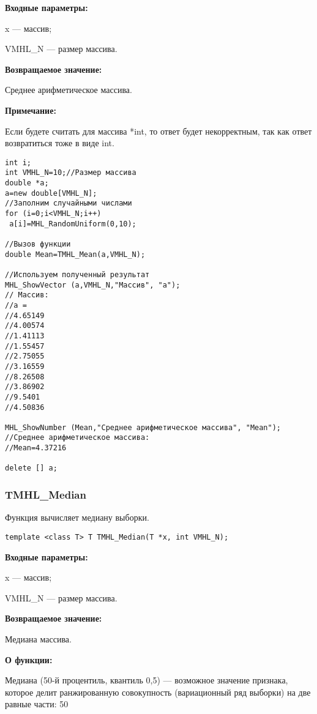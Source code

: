 \documentclass[a4paper,12pt]{article}
\begin{document}
\textbf{Входные параметры:}

 x --- массив;
 
 VMHL\_N --- размер массива.

\textbf{Возвращаемое значение:}

 Среднее арифметическое массива.
 
\textbf{Примечание:}

Если будете считать для массива *int, то ответ будет некорректным, так как ответ возвратиться тоже в виде int.
 



\begin{lstlisting}[label=code_use_TMHL_Mean,caption=Пример использования]
int i;
int VMHL_N=10;//Размер массива
double *a;
a=new double[VMHL_N];
//Заполним случайными числами
for (i=0;i<VMHL_N;i++)
 a[i]=MHL_RandomUniform(0,10);

//Вызов функции
double Mean=TMHL_Mean(a,VMHL_N);

//Используем полученный результат
MHL_ShowVector (a,VMHL_N,"Массив", "a");
// Массив:
//a =
//4.65149
//4.00574
//1.41113
//1.55457
//2.75055
//3.16559
//8.26508
//3.86902
//9.5401
//4.50836

MHL_ShowNumber (Mean,"Среднее арифметическое массива", "Mean");
//Среднее арифметическое массива:
//Mean=4.37216

delete [] a;
\end{lstlisting}

\subsubsection{TMHL\_Median}\label{TMHL_Median}

Функция вычисляет медиану выборки.


\begin{lstlisting}[label=code_syntax_TMHL_Median,caption=Синтаксис]
template <class T> T TMHL_Median(T *x, int VMHL_N);
\end{lstlisting}

\textbf{Входные параметры:}

 x --- массив;
 
 VMHL\_N --- размер массива.

\textbf{Возвращаемое значение:}

 Медиана массива.
 
\textbf{ О функции:}

Медиана (50-й процентиль, квантиль 0,5) — возможное значение признака, которое делит ранжированную совокупность (вариационный ряд выборки) на две равные части: 50 %
\end{document}
